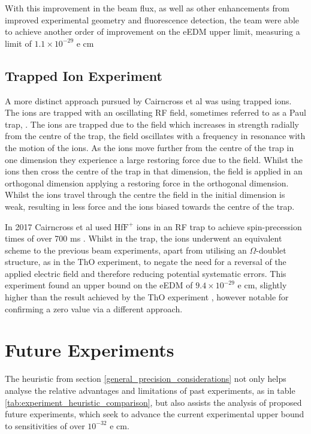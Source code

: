 With this improvement in the beam flux, as well as other enhancements from improved experimental geometry and fluorescence detection, the team were able to achieve another order of improvement on the eEDM upper limit, measuring a limit of $1.1 \times 10^{-29}$ e cm

\subsection{Trapped Ion Experiment}

A more distinct approach pursued by Cairncross et al was using trapped ions. The ions are trapped with an oscillating RF field, sometimes referred to as a Paul trap, . The ions are trapped due to the field which increases in strength radially from the centre of the trap, the field oscillates with a frequency in resonance with the motion of the ions. As the ions move further from the centre of the trap in one dimension they experience a large restoring force due to the field. Whilst the ions then cross the centre of the trap in that dimension, the field is applied in an orthogonal dimension applying a restoring force in the orthogonal dimension. Whilst the ions travel through the centre the field in the initial dimension is weak, resulting in less force and the ions biased towards the centre of the trap.

In 2017 Cairncross et al used Hf$\text{F}^+$ ions in an RF trap to achieve spin-precession times of over 700 ms \cite{Cairncross_2017}. Whilst in the trap, the ions underwent an equivalent scheme to the previous beam experiments, apart from utilising an $\Omega$-doublet structure, as in the ThO experiment, to negate the need for a reversal of the applied electric field and therefore reducing potential systematic errors. This experiment found an upper bound on the eEDM of $9.4 \times 10^{-29}$ e cm, slightly higher than the result achieved by the ThO experiment \cite{ACME_2018}, however notable for confirming a zero value via a different approach.

\section{Future Experiments}

The heuristic from section \ref{general_precision_considerations} not only helps analyse the relative advantages and limitations of past experiments, as in table \ref{tab:experiment_heuristic_comparison}, but also assists the analysis of proposed future experiments, which seek to advance the current experimental upper bound to sensitivities of over $10^{-32}$ e cm.

